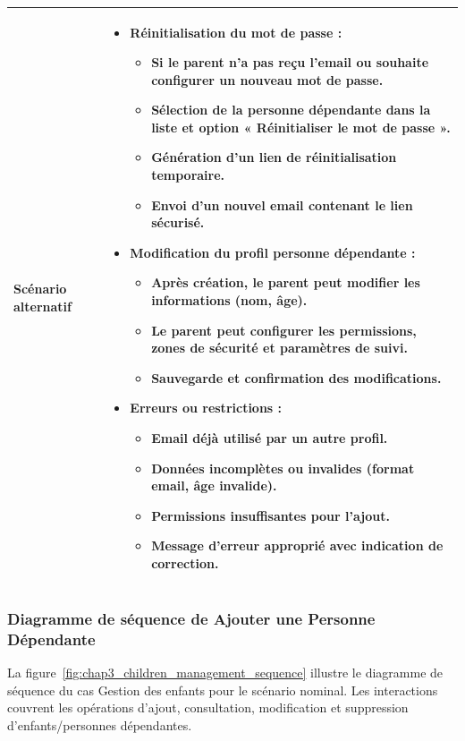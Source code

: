 \begin{longtable}{|p{}|>{\raggedright\arraybackslash}p{}|}
Scénario alternatif &
\begin{itemize}[nosep, leftmargin=*]
\item \textbf{Réinitialisation du mot de passe :}
\begin{itemize}[nosep, leftmargin=*]
\item Si le parent n'a pas reçu l'email ou souhaite configurer un nouveau mot de passe.
\item Sélection de la personne dépendante dans la liste et option « Réinitialiser le mot de passe ».
\item Génération d'un lien de réinitialisation temporaire.
\item Envoi d'un nouvel email contenant le lien sécurisé.
\end{itemize}
\item \textbf{Modification du profil personne dépendante :}
\begin{itemize}[nosep, leftmargin=*]
\item Après création, le parent peut modifier les informations (nom, âge).
\item Le parent peut configurer les permissions, zones de sécurité et paramètres de suivi.
\item Sauvegarde et confirmation des modifications.
\end{itemize}
\item \textbf{Erreurs ou restrictions :}
\begin{itemize}[nosep, leftmargin=*]
\item Email déjà utilisé par un autre profil.
\item Données incomplètes ou invalides (format email, âge invalide).
\item Permissions insuffisantes pour l'ajout.
\item Message d'erreur approprié avec indication de correction.
\end{itemize}
\end{itemize}
\\ \hline

\end{longtable}

\subsubsection{Diagramme de séquence de \og Ajouter une Personne Dépendante \fg}

La figure~\ref{fig:chap3_children_management_sequence} illustre le diagramme de séquence du cas \og Gestion des enfants \fg{} pour le scénario nominal. Les interactions couvrent les opérations d'ajout, consultation, modification et suppression d'enfants/personnes dépendantes.

